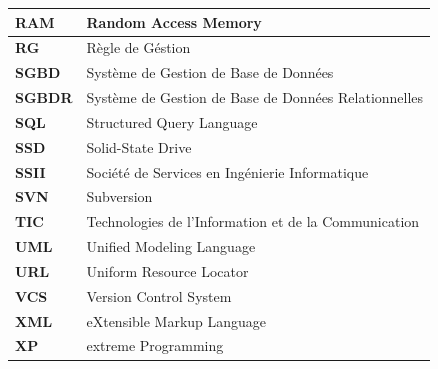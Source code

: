 \documentclass[12pt]{report}
\begin{document}
\begin{longtable}{|p{4cm}|p{10cm}|}
			\hline
			\textbf{RAM} & Random Access Memory\\
			\hline
			\textbf{RG} & Règle de Géstion\\
			\hline
			\textbf{SGBD} & Système de Gestion de Base de Données\\
			\hline
			\textbf{SGBDR} & Système de Gestion de Base de Données Relationnelles\\
			\hline
			\textbf{SQL} & Structured Query Language\\
			\hline
			\textbf{SSD} & Solid-State Drive\\
			\hline
			\textbf{SSII} & Société de Services en Ingénierie Informatique\\
			\hline
			\textbf{SVN} & Subversion\\
			\hline
			\textbf{TIC} & Technologies de l’Information et de la Communication\\
			\hline
			\textbf{UML} & Unified Modeling Language\\
			\hline
			\textbf{URL} & Uniform Resource Locator\\
			\hline
			\textbf{VCS} & Version Control System\\
			\hline
			\textbf{XML} & eXtensible Markup Language\\
			\hline
			\textbf{XP} & extreme Programming\\
			\hline

			\end{longtable}

			\newpage
			\setcounter{page}{1}
\end{document}

